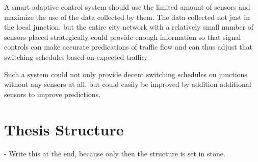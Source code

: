 A smart adaptive control system should use the limited amount of sensors and maximize the use of the data collected by them. The data collected not just in the local junction, but the entire city network with a relatively small number of sensors placed strategically could provide enough information so that signal controls can make accurate predications of traffic flow and can thus adjust that switching schedules based on expected traffic.

Such a system could not only provide decent switching schedules on junctions without any sensors at all, but could easily be improved by addition additional sensors to improve predictions.

\newpage

\section{Thesis Structure}

- Write this at the end, because only then the structure is set in stone.